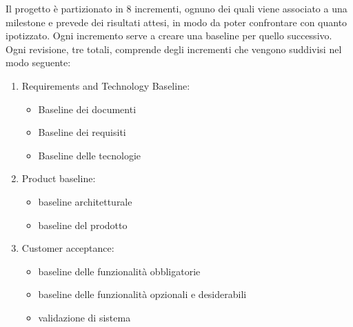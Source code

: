 Il progetto è partizionato in 8 incrementi, ognuno dei quali viene associato a una milestone e prevede dei risultati attesi, in modo da poter confrontare con quanto ipotizzato. 
Ogni incremento  serve a creare una baseline per quello successivo. 
Ogni revisione, tre totali, comprende degli incrementi che vengono suddivisi nel modo seguente:
\begin{enumerate}
    \item Requirements and Technology Baseline:
    \begin{itemize} 
    \item Baseline dei documenti
    \item Baseline dei requisiti
    \item Baseline delle tecnologie
    \end{itemize}
    \item Product baseline:
    \begin{itemize} 
        \item baseline architetturale 
        \item baseline del prodotto
    \end{itemize}
    \item Customer acceptance:
    \begin{itemize}
        \item baseline delle funzionalità obbligatorie
        \item baseline delle funzionalità opzionali e desiderabili
        \item validazione di sistema 
    \end{itemize}
\end{enumerate}

